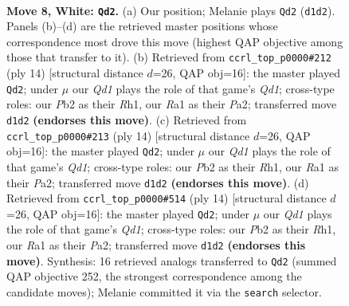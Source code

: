 \documentclass[11pt]{article}
\begin{document}
\begin{figure}[p]\centering
\begin{subfigure}{0.46\textwidth}\centering
\resizebox{\linewidth}{!}{%
\newchessgame
\chessboard[
  setfen={rnbqk2r/pp2ppbp/3p2p1/7n/3NP3/2N1BP2/PPP3PP/R2QKB1R w KQkq - 1 8},
  showmover=false,
  pgfstyle=straightmove, color=movearrow, markmove={d1-d2}
]}
\caption{}
\end{subfigure}\hfill
\begin{subfigure}{0.46\textwidth}\centering
\resizebox{\linewidth}{!}{%
\newchessgame
\chessboard[
  setfen={rnbq1rk1/pp2ppbp/3p1np1/8/3NP3/2N1BP2/PPP3PP/R2QKB1R w KQ - 1 8},
  showmover=false,
  pgfstyle=straightmove, color=movearrow, markmove={d1-d2}
]}
\caption{}
\end{subfigure}
\\[4pt]
\begin{subfigure}{0.46\textwidth}\centering
\resizebox{\linewidth}{!}{%
\newchessgame
\chessboard[
  setfen={rnbq1rk1/pp2ppbp/3p1np1/8/3NP3/2N1BP2/PPP3PP/R2QKB1R w KQ - 1 8},
  showmover=false,
  pgfstyle=straightmove, color=movearrow, markmove={d1-d2}
]}
\caption{}
\end{subfigure}\hfill
\begin{subfigure}{0.46\textwidth}\centering
\resizebox{\linewidth}{!}{%
\newchessgame
\chessboard[
  setfen={rnbq1rk1/pp2ppbp/3p1np1/8/3NP3/2N1BP2/PPP3PP/R2QKB1R w KQ - 1 8},
  showmover=false,
  pgfstyle=straightmove, color=movearrow, markmove={d1-d2}
]}
\caption{}
\end{subfigure}
\caption{\textbf{Move 8, White: \texttt{Qd2}.} (a) Our position; Melanie plays \texttt{Qd2} (\texttt{d1d2}). Panels (b)--(d) are the retrieved master positions whose correspondence most drove this move (highest QAP objective among those that transfer to it). (b) Retrieved from \texttt{ccrl\_top\_p0000\#212} (ply 14) [structural distance $d$=26, QAP obj=16]: the master played \texttt{Qd2}; under $\mu$ our \emph{Qd1} plays the role of that game's \emph{Qd1}; cross-type roles: our \emph{P}b2 as their \emph{R}h1, our \emph{R}a1 as their \emph{P}a2; transferred move \texttt{d1d2} \textbf{(endorses this move)}. (c) Retrieved from \texttt{ccrl\_top\_p0000\#213} (ply 14) [structural distance $d$=26, QAP obj=16]: the master played \texttt{Qd2}; under $\mu$ our \emph{Qd1} plays the role of that game's \emph{Qd1}; cross-type roles: our \emph{P}b2 as their \emph{R}h1, our \emph{R}a1 as their \emph{P}a2; transferred move \texttt{d1d2} \textbf{(endorses this move)}. (d) Retrieved from \texttt{ccrl\_top\_p0000\#514} (ply 14) [structural distance $d$=26, QAP obj=16]: the master played \texttt{Qd2}; under $\mu$ our \emph{Qd1} plays the role of that game's \emph{Qd1}; cross-type roles: our \emph{P}b2 as their \emph{R}h1, our \emph{R}a1 as their \emph{P}a2; transferred move \texttt{d1d2} \textbf{(endorses this move)}. Synthesis: 16 retrieved analogs transferred to \texttt{Qd2} (summed QAP objective 252, the strongest correspondence among the candidate moves); Melanie committed it via the \texttt{search} selector.}
\label{fig:thought-m14}
\end{figure}
\end{document}

